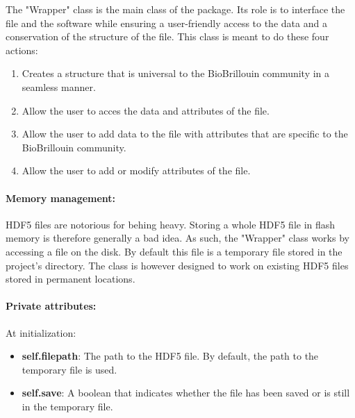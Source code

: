 \begin{tcolorbox}
    The "Wrapper" class is the main class of the package. Its role is to interface the file and the software while ensuring a user-friendly access to the data and a conservation of the structure of the file. This class is meant to do these four actions:
    \begin{enumerate}
        \item Creates a structure that is universal to the BioBrillouin community in a seamless manner.
        \item Allow the user to acces the data and attributes of the file.
        \item Allow the user to add data to the file with attributes that are specific to the BioBrillouin community.
        \item Allow the user to add or modify attributes of the file.
    \end{enumerate}
\end{tcolorbox}

\paragraph{Memory management:}
HDF5 files are notorious for behing heavy. Storing a whole HDF5 file in flash memory is therefore generally a bad idea. As such, the "Wrapper" class works by accessing a file on the disk. By default this file is a temporary file stored in the project's directory. The class is however designed to work on existing HDF5 files stored in permanent locations.

\paragraph{Private attributes:} 
At initialization:
\begin{itemize}
    \item \textbf{self.filepath}: The path to the HDF5 file. By default, the path to the temporary file is used.
    \item \textbf{self.save}: A boolean that indicates whether the file has been saved or is still in the temporary file.
\end{itemize}

